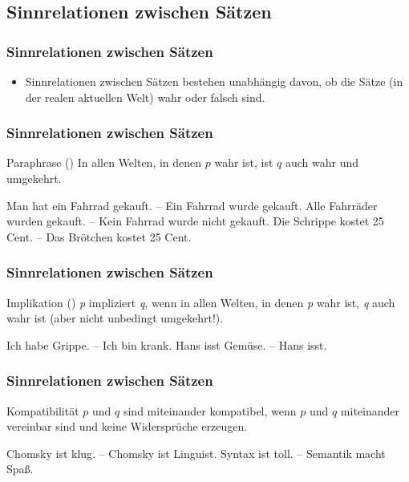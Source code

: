 \subsection{Sinnrelationen zwischen Sätzen}

\begin{frame}
\frametitle{Sinnrelationen zwischen Sätzen}

\begin{itemize}
	\item Sinnrelationen zwischen Sätzen bestehen unabhängig davon, ob die Sätze (in der realen aktuellen Welt) wahr oder falsch sind.
\end{itemize}

\end{frame}


\begin{frame}
\frametitle{Sinnrelationen zwischen Sätzen}

\begin{block}{Paraphrase ()}
In allen Welten, in denen $p$ wahr ist, ist $q$ auch wahr und umgekehrt.
\end{block}


	\eal 
		\ex Man hat ein Fahrrad gekauft. -- Ein Fahrrad wurde gekauft.
		\ex Alle Fahrräder wurden gekauft. -- Kein Fahrrad wurde nicht gekauft.
		\ex Die Schrippe kostet 25 Cent. -- Das Brötchen kostet 25 Cent.
	\zl
		
\end{frame}


\begin{frame}
\frametitle{Sinnrelationen zwischen Sätzen}

\begin{block}{Implikation ()}
\textit{p} impliziert \textit{q}, wenn in allen Welten, in denen \textit{p} wahr ist, \textit{q} auch wahr ist (aber nicht unbedingt umgekehrt!).
\end{block}
		
\eal 
	\ex Ich habe Grippe. -- Ich bin krank.
	\ex Hans isst Gemüse. -- Hans isst.
\zl

\end{frame}


\begin{frame}
\frametitle{Sinnrelationen zwischen Sätzen}

\begin{block}{Kompatibilität}
$p$ und $q$ sind miteinander kompatibel, wenn $p$ und $q$ miteinander vereinbar sind und keine Widersprüche erzeugen.
\end{block}

		\eal 
			\ex Chomsky ist klug. -- Chomsky ist Linguist.
			\ex Syntax ist toll. -- Semantik macht Spa\ss{}.
		\zl
		
\end{frame}


